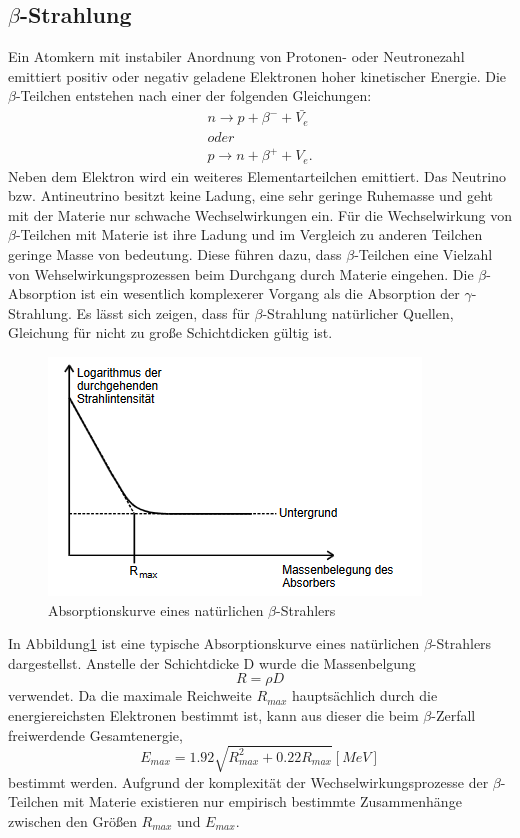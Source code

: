 \subsection{\texorpdfstring{$\beta$}{Beta}-Strahlung}
Ein Atomkern mit instabiler Anordnung von Protonen- oder Neutronezahl emittiert positiv oder negativ geladene Elektronen hoher kinetischer Energie.
Die $\beta$-Teilchen entstehen nach einer der folgenden Gleichungen:
\begin{eqnarray}
n \rightarrow p + \beta^- + \bar{V_e} \\
\nonumber
oder\\
p \rightarrow n + \beta^+ + V_e .
\end{eqnarray}
Neben dem Elektron wird ein weiteres Elementarteilchen emittiert.
Das Neutrino bzw. Antineutrino besitzt keine Ladung, eine sehr geringe Ruhemasse und geht mit der Materie nur schwache Wechselwirkungen ein.
Für die Wechselwirkung von $\beta$-Teilchen mit Materie ist ihre Ladung und im Vergleich zu anderen Teilchen geringe Masse von bedeutung.
Diese führen dazu, dass $\beta$-Teilchen eine Vielzahl von Wehselwirkungsprozessen beim Durchgang durch Materie eingehen.
Die $\beta$-Absorption ist ein wesentlich komplexerer Vorgang als die Absorption der $\gamma$-Strahlung.
Es lässt sich zeigen, dass für $\beta$-Strahlung natürlicher Quellen, Gleichung für nicht zu große Schichtdicken gültig ist.
\begin{figure}[H]
    \centering
    \includegraphics[width=\textwidth]{content/Absorbbeta.png}
    \caption{Absorptionskurve eines natürlichen $\beta$-Strahlers}
    \label{fig:abs}
\end{figure}
\noindent
In Abbildung\ref{fig:abs} ist eine typische Absorptionskurve eines natürlichen $\beta$-Strahlers dargestellst.
Anstelle der Schichtdicke D wurde die Massenbelgung
\begin{equation}
  R = \rho D
\end{equation}
verwendet.
Da die maximale Reichweite $R_{max}$ hauptsächlich durch die energiereichsten Elektronen bestimmt ist, kann aus dieser die beim $\beta$-Zerfall freiwerdende Gesamtenergie,
\begin{equation}
  E_{max}= 1.92  \sqrt{R_{max}^2 +0.22R_{max}} [MeV]
\end{equation}
bestimmt werden.
Aufgrund der komplexität der Wechselwirkungsprozesse der $\beta$-Teilchen mit Materie existieren nur empirisch bestimmte Zusammenhänge zwischen den Größen $R_{max}$ und $E_{max}$.
